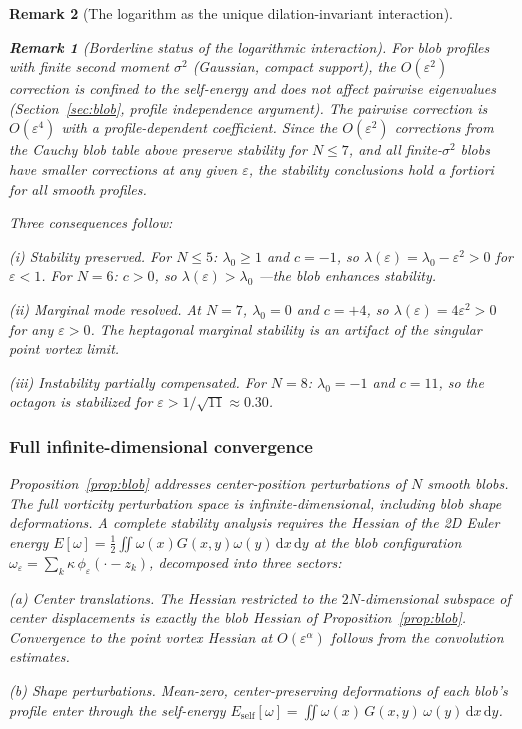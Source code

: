 \documentclass[12pt, a4paper]{article}
\newtheorem{remark}{Remark}[section]
\numberwithin{equation}{section}
\newcommand{\dd}{\mathrm{d}}
\begin{document}
\begin{remark}[The logarithm as the unique dilation-invariant interaction]
\begin{remark}[Borderline status of the logarithmic interaction]
For blob profiles with finite second moment $\sigma^2$ (Gaussian,
compact support), the $O(\varepsilon^2)$ correction is confined to
the self-energy and does not affect pairwise eigenvalues
(Section~\ref{sec:blob}, profile independence argument).  The
pairwise correction is $O(\varepsilon^4)$ with a profile-dependent
coefficient.  Since the $O(\varepsilon^2)$ corrections from the Cauchy
blob table above preserve stability for $N \le 7$, and all
finite-$\sigma^2$ blobs have \emph{smaller} corrections at any given
$\varepsilon$, the stability conclusions hold \emph{a fortiori} for
all smooth profiles.

Three consequences follow:

\emph{(i) Stability preserved.}  For $N \le 5$:
$\lambda_0 \ge 1$ and $c = -1$, so
$\lambda(\varepsilon) = \lambda_0 - \varepsilon^2 > 0$
for $\varepsilon < 1$.
For $N = 6$: $c > 0$, so $\lambda(\varepsilon) > \lambda_0$
---the blob \emph{enhances} stability.

\emph{(ii) Marginal mode resolved.}  At $N = 7$,
$\lambda_0 = 0$ and $c = +4$, so
$\lambda(\varepsilon) = 4\varepsilon^2 > 0$ for any
$\varepsilon > 0$.  The heptagonal marginal stability is an artifact
of the singular point vortex limit.

\emph{(iii) Instability partially compensated.}  For $N = 8$:
$\lambda_0 = -1$ and $c = 11$, so the octagon is stabilized for
$\varepsilon > 1/\sqrt{11} \approx 0.30$.

\subsubsection{Full infinite-dimensional convergence}

Proposition~\ref{prop:blob} addresses center-position perturbations of
$N$ smooth blobs.  The full vorticity perturbation space is
infinite-dimensional, including blob \emph{shape} deformations.  A
complete stability analysis requires the Hessian of the 2D Euler energy
$E[\omega] = \tfrac12\iint\omega(x)G(x,y)\omega(y)\,\dd x\,\dd y$ at
the blob configuration
$\omega_\varepsilon = \sum_k \kappa\,\phi_\varepsilon(\cdot - z_k)$,
decomposed into three sectors:

\emph{(a) Center translations.}  The Hessian restricted to the
$2N$-dimensional subspace of center displacements is \emph{exactly}
the blob Hessian of Proposition~\ref{prop:blob}.  Convergence to the
point vortex Hessian at $O(\varepsilon^\alpha)$ follows from the
convolution estimates.

\emph{(b) Shape perturbations.}  Mean-zero, center-preserving
deformations of each blob's profile enter through the self-energy
$E_{\mathrm{self}}[\omega] = \iint\omega(x)\,G(x,y)\,\omega(y)\,
\dd x\,\dd y$.


\end{remark}
\end{remark}
\end{document}
